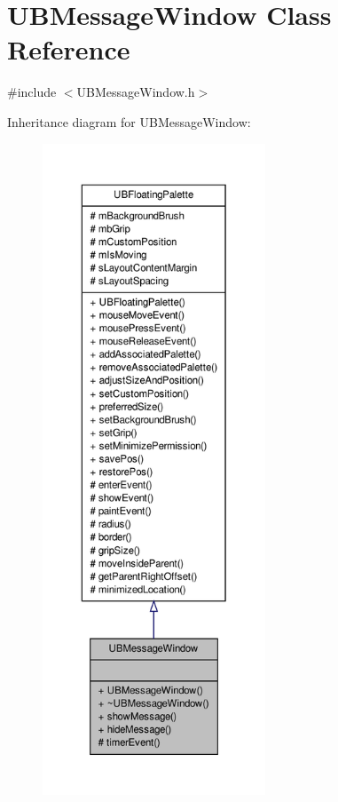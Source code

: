 \hypertarget{class_u_b_message_window}{\section{U\-B\-Message\-Window Class Reference}
\label{d5/d02/class_u_b_message_window}
}


{\ttfamily \#include $<$U\-B\-Message\-Window.\-h$>$}



Inheritance diagram for U\-B\-Message\-Window\-:
\nopagebreak
\begin{figure}[H]
\begin{center}
\leavevmode
\includegraphics[height=550pt]{db/d85/class_u_b_message_window__inherit__graph}
\end{center}
\end{figure}


